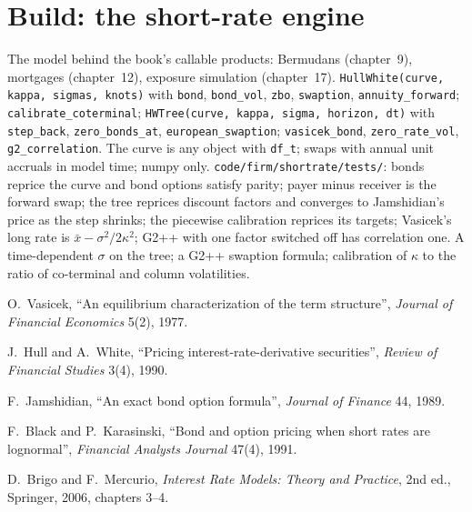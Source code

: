 \section{Build: the short-rate engine}\label{bld:rc:short-rate-models:shortrate}

\begin{build}
 The model behind the book's callable products: Bermudans
(chapter~9), mortgages (chapter~12), exposure simulation (chapter~17).
 \texttt{HullWhite(curve, kappa, sigmas, knots)} with
\texttt{bond}, \texttt{bond\_vol}, \texttt{zbo}, \texttt{swaption},
\texttt{annuity\_forward}; \texttt{calibrate\_coterminal}; \texttt{HWTree(curve,
kappa, sigma, horizon, dt)} with \texttt{step\_back}, \texttt{zero\_bonds\_at},
\texttt{european\_swaption}; \texttt{vasicek\_bond}, \texttt{zero\_rate\_vol},
\texttt{g2\_correlation}.
 The curve is any object with \texttt{df\_t}; swaps with annual unit
accruals in model time; numpy only.
 \texttt{code/firm/shortrate/tests/}: bonds reprice the
curve and bond options satisfy parity; payer minus receiver is the forward
swap; the tree reprices discount factors and converges to Jamshidian's price as
the step shrinks; the piecewise calibration reprices its targets; Vasicek's long
rate is $\bar x-\sigma^2/2\kappa^2$; G2++ with one factor switched off has
correlation one.
 A time-dependent $\sigma$ on the tree; a G2++ swaption formula;
calibration of $\kappa$ to the ratio of co-terminal and column volatilities.
\end{build}

\begin{omsources}
\item O.\ Vasicek, ``An equilibrium characterization of the term structure'',
\emph{Journal of Financial Economics} 5(2), 1977.
\item J.\ Hull and A.\ White, ``Pricing interest-rate-derivative securities'',
\emph{Review of Financial Studies} 3(4), 1990.
\item F.\ Jamshidian, ``An exact bond option formula'', \emph{Journal of Finance}
44, 1989.
\item F.\ Black and P.\ Karasinski, ``Bond and option pricing when short rates are
lognormal'', \emph{Financial Analysts Journal} 47(4), 1991.
\item D.\ Brigo and F.\ Mercurio, \emph{Interest Rate Models: Theory and Practice},
2nd ed., Springer, 2006, chapters 3--4.
\end{omsources}


